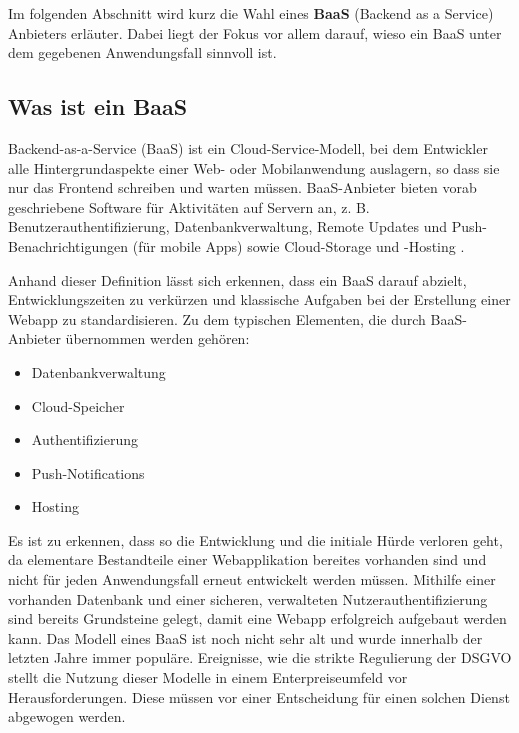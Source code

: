 
Im folgenden Abschnitt wird kurz die Wahl eines \textbf{BaaS} (Backend as a Service) Anbieters erläuter. Dabei liegt der Fokus vor allem darauf, wieso ein BaaS unter dem gegebenen Anwendungsfall sinnvoll ist.

\subsection{Was ist ein BaaS}
\begin{definition}
    Backend-as-a-Service (BaaS) ist ein Cloud-Service-Modell, bei dem Entwickler alle Hintergrundaspekte einer Web- oder Mobilanwendung auslagern, so dass sie nur das Frontend schreiben und warten müssen. BaaS-Anbieter bieten vorab geschriebene Software für Aktivitäten auf Servern an, z. B. Benutzerauthentifizierung, Datenbankverwaltung, Remote Updates und Push-Benachrichtigungen (für mobile Apps) sowie Cloud-Storage und -Hosting
    \cite{cloudfare}.

    Anhand dieser Definition lässt sich erkennen, dass ein BaaS darauf abzielt, Entwicklungszeiten zu verkürzen und klassische Aufgaben bei der Erstellung einer Webapp zu standardisieren. Zu dem typischen Elementen, die durch BaaS-Anbieter übernommen werden gehören:
    \begin{itemize}
        \item Datenbankverwaltung
        \item Cloud-Speicher
        \item Authentifizierung
        \item Push-Notifications
        \item Hosting
    \end{itemize}

    Es ist zu erkennen, dass so die Entwicklung und die initiale Hürde verloren geht, da elementare Bestandteile einer Webapplikation bereites vorhanden sind und nicht für jeden Anwendungsfall erneut entwickelt werden müssen. Mithilfe einer vorhanden Datenbank und einer sicheren, verwalteten Nutzerauthentifizierung sind bereits Grundsteine gelegt, damit eine Webapp erfolgreich aufgebaut werden kann. Das Modell eines BaaS ist noch nicht sehr alt und wurde innerhalb der letzten Jahre immer populäre. Ereignisse, wie die strikte Regulierung der DSGVO stellt die Nutzung dieser Modelle in einem Enterpreiseumfeld vor Herausforderungen. Diese müssen vor einer Entscheidung für einen solchen Dienst abgewogen werden.


\end{definition}
